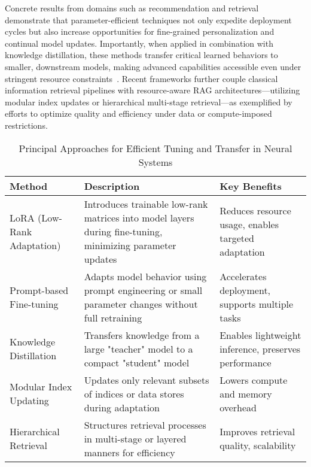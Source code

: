 \documentclass[sigconf]{acmart}
\begin{document}
Concrete results from domains such as recommendation and retrieval demonstrate that parameter-efficient techniques not only expedite deployment cycles but also increase opportunities for fine-grained personalization and continual model updates. Importantly, when applied in combination with knowledge distillation, these methods transfer critical learned behaviors to smaller, downstream models, making advanced capabilities accessible even under stringent resource constraints~\cite{ref55}. Recent frameworks further couple classical information retrieval pipelines with resource-aware RAG architectures—utilizing modular index updates or hierarchical multi-stage retrieval—as exemplified by efforts to optimize quality and efficiency under data or compute-imposed restrictions.

\begin{table*}[htbp]
\centering
\caption{Principal Approaches for Efficient Tuning and Transfer in Neural Systems}
\label{tab:efficient_transfer}
\begin{adjustbox}{max width=\textwidth}
\begin{tabular}{lll}
\toprule
\textbf{Method} & \textbf{Description} & \textbf{Key Benefits} \\
\midrule
LoRA (Low-Rank Adaptation) & Introduces trainable low-rank matrices into model layers during fine-tuning, minimizing parameter updates & Reduces resource usage, enables targeted adaptation \\
Prompt-based Fine-tuning & Adapts model behavior using prompt engineering or small parameter changes without full retraining & Accelerates deployment, supports multiple tasks \\
Knowledge Distillation & Transfers knowledge from a large "teacher" model to a compact "student" model & Enables lightweight inference, preserves performance \\
Modular Index Updating & Updates only relevant subsets of indices or data stores during adaptation & Lowers compute and memory overhead \\
Hierarchical Retrieval & Structures retrieval processes in multi-stage or layered manners for efficiency & Improves retrieval quality, scalability \\
\bottomrule
\end{tabular}
\end{adjustbox}
\end{table*}
\end{document}
